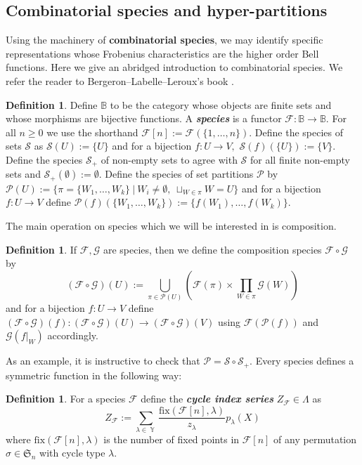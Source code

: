\documentclass[12pt,reqno]{amsart}
\theoremstyle{definition}
\newtheorem{defn}[thm]{Definition}
\DeclareMathOperator{\Par}{\mathbb{Y}}
\begin{document}
\subsection{Combinatorial species and hyper-partitions}

Using the machinery of \textbf{combinatorial species}, we may identify specific representations whose Frobenius characteristics are the higher order Bell functions. Here we give an abridged introduction to combinatorial species. We refer the reader to Bergeron--Labelle--Leroux's book \cite{BLL98}.

\begin{defn}
    Define $\mathbb{B}$ to be the category whose objects are finite sets and whose morphisms are bijective functions. A  \textit{\textbf{species}} is a functor $\mathcal{F}: \mathbb{B} \rightarrow \mathbb{B}.$ For all $n \geq 0$ we use the shorthand $\mathcal{F}[n]:= \mathcal{F}(\{1,\ldots, n\}).$ Define the species of sets $\mathcal{S}$ as $\mathcal{S}(U) := \{U\}$ and for a bijection $f:U \rightarrow V,$ $\mathcal{S}(f)( \{U\}):= \{V\}.$ Define the species $\mathcal{S}_{+}$ of non-empty sets to agree with $\mathcal{S}$ for all finite non-empty sets and $\mathcal{S}_{+}(\emptyset) := \emptyset.$ Define the species of set partitions $\mathcal{P}$ by 
    $\mathcal{P}(U):= \{ \pi = \{W_1,\ldots,W_k\} ~|~ W_{i} \neq \emptyset,~ \sqcup_{W \in \pi} W = U\}$ and for a bijection $f:U \rightarrow V$ define $\mathcal{P}(f)( \{W_1,\ldots,W_k\}):= \{f(W_1),\ldots,f(W_k)\}.$
\end{defn}

 The main operation on species which we will be interested in is composition. 

\begin{defn}
    If $\mathcal{F},\mathcal{G}$ are species, then we define the composition species $\mathcal{F}\circ \mathcal{G}$ by 
    $$(\mathcal{F}\circ\mathcal{G})(U):= \bigcup_{\pi \in \mathcal{P}(U)} \left( \mathcal{F}(\pi) \times \prod_{W \in \pi} \mathcal{G}(W) \right)$$ and for a bijection $f:U \rightarrow V$ define $(\mathcal{F}\circ\mathcal{G})(f):(\mathcal{F}\circ\mathcal{G})(U) \rightarrow (\mathcal{F}\circ\mathcal{G})(V)$ using $\mathcal{F}(\mathcal{P}(f))$ and $\mathcal{G}(f|_{W})$ accordingly. 
\end{defn}

As an example, it is instructive to check that $\mathcal{P} = \mathcal{S}\circ \mathcal{S}_{+}.$ Every species defines a symmetric function in the following way:

\begin{defn}
    For a species $\mathcal{F}$ define the \textit{\textbf{cycle index series}} $Z_{\mathcal{F}} \in \Lambda$ as 
    $$Z_{\mathcal{F}}:= \sum_{\lambda \in \Par} \frac{\mathrm{fix}(\mathcal{F}[n],\lambda)}{z_{\lambda}} p_{\lambda}(X)$$ where $\mathrm{fix}(\mathcal{F}[n],\lambda)$ is the number of fixed points in $\mathcal{F}[n]$ of any permutation $\sigma \in \mathfrak{S}_n$ with cycle type $\lambda.$
\end{defn}
\end{document}
